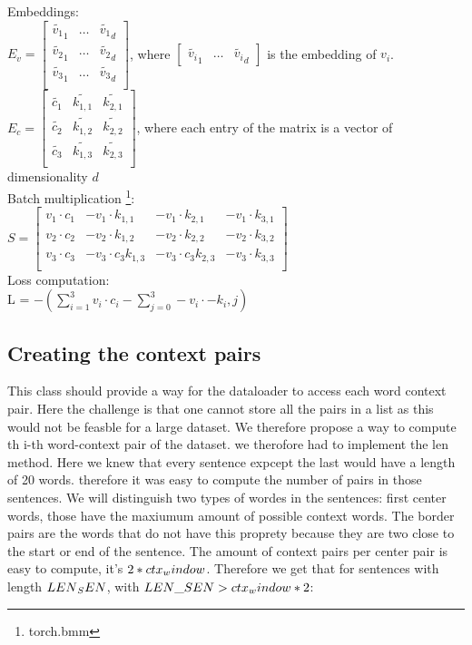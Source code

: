 Embeddings:\\
$E_v = \begin{bmatrix}
\tilde{v_1}_1 & \ldots & \tilde{v_1}_d\\
\tilde{v_2}_1 & \ldots & \tilde{v_2}_d\\
\tilde{v_3}_1 & \ldots & \tilde{v_3}_d\\
\end{bmatrix}
$, where $\begin{bmatrix}
\tilde{v_i}_1 & \ldots & \tilde{v_i}_d \end{bmatrix}$ is the embedding of $v_i$.  \\$E_c = \begin{bmatrix}
\tilde{c_1 }& \tilde{k_{1,1}} & \tilde{k_{2,1}} \\
\tilde{c_2 }& \tilde{k_{1,2}}& \tilde{k_{2,2}} \\
\tilde{c_3 }&\tilde{ k_{1,3} }& \tilde{k_{2,3}}\\
\end{bmatrix}$,
where each entry of the matrix is a vector of dimensionality $d$\\
Batch multiplication \footnote{torch.bmm}:\\
$S = \begin{bmatrix}
v_1 \cdot c_1 & -v_1 \cdot k_{1,1} & -v_1 \cdot  k_{2,1} & -v_1 \cdot  k_{3,1}\\
v_2 \cdot c_2 & -v_2 \cdot k_{1,2} & -v_2 \cdot k_{2,2} & -v_2 \cdot k_{3,2}\\
v_3 \cdot c_3 &-v_3 \cdot c_3  k_{1,3} & -v_3 \cdot c_3 k_{2,3}&-v_3 \cdot k_{3,3}\\
\end{bmatrix}$\\
Loss computation: \\
 L = $-(\sum_{i=1}^3 v_i \cdot c_i - \sum_{j=0}^3 -v_i \cdot -k_i,j)$

\subsection{Creating the context pairs}
This class should provide a way for the dataloader to access each word context pair. Here the challenge is that one cannot store all the pairs in a list as this would not be feasble for a large dataset. We therefore propose a way to compute th i-th word-context pair of the dataset. we therofore had to implement the len method. Here we knew that every sentence expcept the last would have a length of 20 words. therefore it was easy to compute the number of pairs in those sentences.
We will distinguish two types of wordes in the sentences: first center words, those have the maxiumum amount of possible context words. The border pairs are the words that do not have this proprety because they are two close to the start or end of the sentence. The amount of context pairs per center pair is easy to compute, it's $2*ctx\\_window$. Therefore we get that for sentences with length $LEN\\_SEN$, with $LEN\_SEN  > ctx\\_window*2$:

